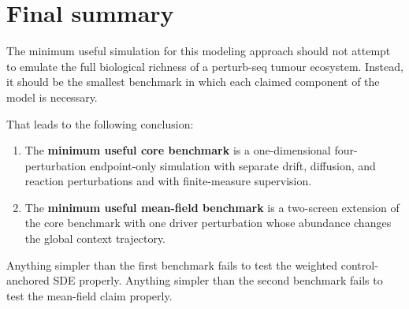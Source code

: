 \documentclass[11pt]{article}
\begin{document}
\section{Final summary}

The minimum useful simulation for this modeling approach should not attempt to emulate the full biological richness of a perturb-seq tumour ecosystem. Instead, it should be the smallest benchmark in which each claimed component of the model is necessary.

That leads to the following conclusion:

\begin{enumerate}[label=(\arabic*),leftmargin=2.2em]
    \item The \textbf{minimum useful core benchmark} is a one-dimensional four-perturbation endpoint-only simulation with separate drift, diffusion, and reaction perturbations and with finite-measure supervision.
    \item The \textbf{minimum useful mean-field benchmark} is a two-screen extension of the core benchmark with one driver perturbation whose abundance changes the global context trajectory.
\end{enumerate}

Anything simpler than the first benchmark fails to test the weighted control-anchored SDE properly. Anything simpler than the second benchmark fails to test the mean-field claim properly.
\end{document}
